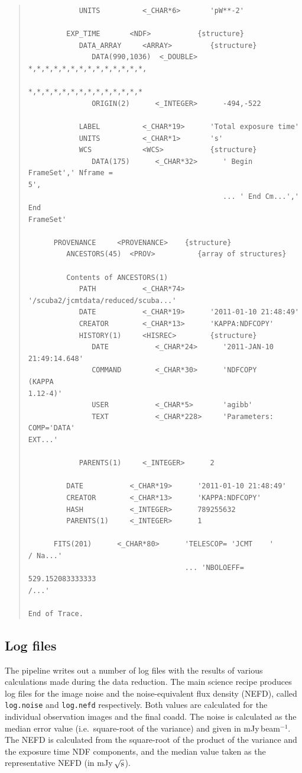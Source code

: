 \documentclass[twoside,11pt]{article}
\renewcommand{\_}{\texttt{\symbol{95}}}
\newenvironment{myquote}{\begin{quote}\begin{small}}{\end{small}\end{quote}}
\begin{document}
\begin{myquote}
\begin{verbatim}
            UNITS          <_CHAR*6>       'pW**-2'

         EXP_TIME       <NDF>           {structure}
            DATA_ARRAY     <ARRAY>         {structure}
               DATA(990,1036)  <_DOUBLE>      *,*,*,*,*,*,*,*,*,*,*,*,*,*,
                                              *,*,*,*,*,*,*,*,*,*,*,*,*,*
               ORIGIN(2)      <_INTEGER>      -494,-522

            LABEL          <_CHAR*19>      'Total exposure time'
            UNITS          <_CHAR*1>       's'
            WCS            <WCS>           {structure}
               DATA(175)      <_CHAR*32>      ' Begin FrameSet',' Nframe =
5',
                                              ... ' End Cm...',' End
FrameSet'

      PROVENANCE     <PROVENANCE>    {structure}
         ANCESTORS(45)  <PROV>          {array of structures}

         Contents of ANCESTORS(1)
            PATH           <_CHAR*74>
'/scuba2/jcmtdata/reduced/scuba...'
            DATE           <_CHAR*19>      '2011-01-10 21:48:49'
            CREATOR        <_CHAR*13>      'KAPPA:NDFCOPY'
            HISTORY(1)     <HISREC>        {structure}
               DATE           <_CHAR*24>      '2011-JAN-10 21:49:14.648'
               COMMAND        <_CHAR*30>      'NDFCOPY         (KAPPA
1.12-4)'
               USER           <_CHAR*5>       'agibb'
               TEXT           <_CHAR*228>     'Parameters: COMP='DATA'
EXT...'

            PARENTS(1)     <_INTEGER>      2

         DATE           <_CHAR*19>      '2011-01-10 21:48:49'
         CREATOR        <_CHAR*13>      'KAPPA:NDFCOPY'
         HASH           <_INTEGER>      789255632
         PARENTS(1)     <_INTEGER>      1

      FITS(201)      <_CHAR*80>      'TELESCOP= 'JCMT    '           / Na...'
                                     ... 'NBOLOEFF=     529.152083333333
/...'

End of Trace.
\end{verbatim}
\end{myquote}

\subsection{Log files}

The pipeline writes out a number of log files with the results of
various calculations made during the data reduction. The main science
recipe produces log files for the image noise and the noise-equivalent
flux density (NEFD), called \texttt{log.noise} and \texttt{log.nefd}
respectively. Both values are calculated for the individual
observation images and the final coadd. The noise is calculated as the
median error value (i.e.\ square-root of the variance) and given in
mJy\,beam$^{-1}$. The NEFD is calculated from the square-root of the
product of the variance and the exposure time NDF components, and the
median value taken as the representative NEFD (in mJy\,$\sqrt{\rm s}$).
\end{document}

